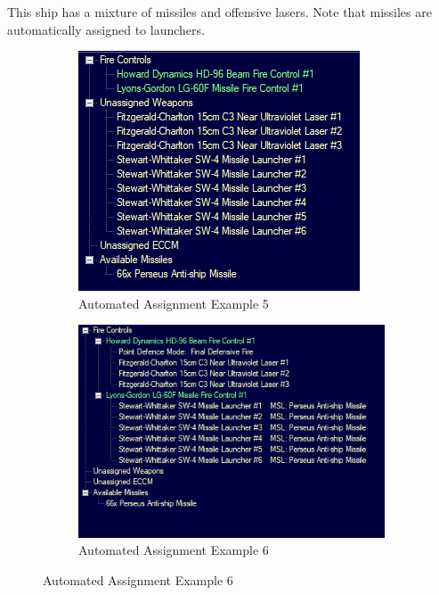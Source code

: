 \documentclass[../Aurora C# unofficial manual.tex]{subfiles}
\begin{document}
	This ship has a mixture of missiles and offensive lasers. Note that missiles are automatically assigned to launchers.
	\begin{figure}[H]
		\centering
		\begin{subfigure}{.5\textwidth}
			\centering
			\includegraphics[width=0.5\linewidth]{images/AutomatedAssignment5}
			\caption[Automated Assignment]{Automated Assignment Example 5}
			\label{fig:automatedassignment5}
		\end{subfigure}%
		\begin{subfigure}{.5\textwidth}
			\centering
			\includegraphics[width=0.5\linewidth]{images/AutomatedAssignment6}
			\caption[Automated Assignment]{Automated Assignment Example 6}
			\label{fig:automatedassignment6}
		\end{subfigure}
	\end{figure}
	
\end{document}
